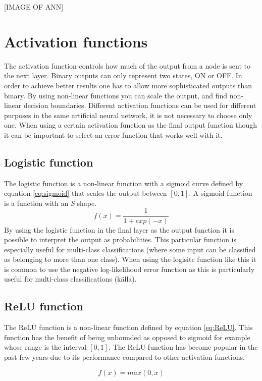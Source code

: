 [IMAGE OF ANN]

\section{Activation functions}\label{activationfunction}
The activation function controls how much of the output from a node is sent to the next layer. Binary outputs can only represent two states, ON or OFF. In order to achieve better results one has to allow more sophisticated outputs than binary. By using non-linear functions you can scale the output, and find non-linear decision boundaries. Different activation functions can be used for different purposes in the same artificial neural network, it is not necessary to choose only one. When using a certain activation function as the final output function though it can be important to select an error function that works well with it.

\subsection{Logistic function}
The logistic function is a non-linear function with a sigmoid curve defined by equation \ref{eq:sigmoid} that scales the output between $[0, 1]$. A sigmoid function is a function with an \textit{S} shape.
\begin{equation}\label{eq:sigmoid}
    f(x)=\frac{1}{1+exp(-x)}
\end{equation}
By using the logistic function in the final layer as the output function it is possible to interpret the output as probabilities. This particular function is especially useful for multi-class classifications (where some input can be classified as belonging to more than one class). When using the logisitc function like this it is common to use the negative log-likelihood error function as this is particularly useful for multi-class classifications (källa).

\subsection{ReLU function}
The ReLU function is a non-linear function defined by equation \ref{eq:ReLU}. This function has the benefit of being unbounded as opposed to sigmoid for example whose range is the interval $[0, 1]$. The ReLU function has become popular in the past few years due to its performance compared to other activation functions. \parencite{glorot2011deep}

\begin{equation}\label{eq:ReLU}
    f(x) = max(0,x)
\end{equation}
